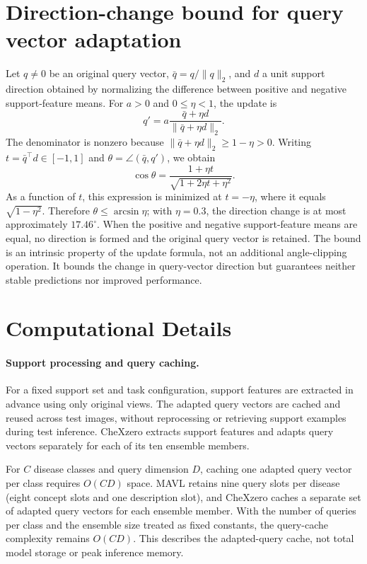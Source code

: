 \section{Direction-change bound for query vector adaptation}
\label{supp:query_geometry}
Let $q\ne0$ be an original query vector, $\bar q=q/\|q\|_2$, and $d$ a unit support direction obtained by normalizing the difference between positive and negative support-feature means. For $a>0$ and $0\leq\eta<1$, the update is
\begin{equation}
q'=a\frac{\bar q+\eta d}{\|\bar q+\eta d\|_2}.
\end{equation}
The denominator is nonzero because $\|\bar q+\eta d\|_2\geq1-\eta>0$. Writing $t=\bar q^\top d\in[-1,1]$ and $\theta=\angle(\bar q,q')$, we obtain
\begin{equation}
\cos\theta=\frac{1+\eta t}{\sqrt{1+2\eta t+\eta^2}}.
\end{equation}
As a function of $t$, this expression is minimized at $t=-\eta$, where it equals $\sqrt{1-\eta^2}$. Therefore $\theta\leq\arcsin\eta$; with $\eta=0.3$, the direction change is at most approximately $17.46^\circ$. When the positive and negative support-feature means are equal, no direction is formed and the original query vector is retained. The bound is an intrinsic property of the update formula, not an additional angle-clipping operation. It bounds the change in query-vector direction but guarantees neither stable predictions nor improved performance.

\section{Computational Details}
\label{supp:computation}
\paragraph{Support processing and query caching.}
For a fixed support set and task configuration, support features are extracted in advance using only original views. The adapted query vectors are cached and reused across test images, without reprocessing or retrieving support examples during test inference. CheXzero extracts support features and adapts query vectors separately for each of its ten ensemble members.

For $C$ disease classes and query dimension $D$, caching one adapted query vector per class requires $O(CD)$ space. MAVL retains nine query slots per disease (eight concept slots and one description slot), and CheXzero caches a separate set of adapted query vectors for each ensemble member. With the number of queries per class and the ensemble size treated as fixed constants, the query-cache complexity remains $O(CD)$. This describes the adapted-query cache, not total model storage or peak inference memory.

